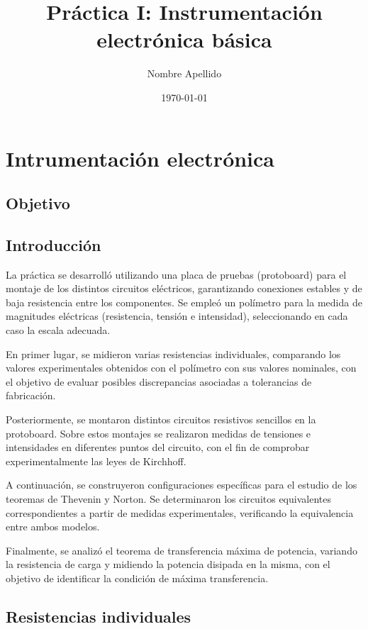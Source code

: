 \documentclass[a4paper,12pt]{article}
\title{Práctica I: Instrumentación electrónica básica}
\author{Nombre Apellido}
\date{\today}
\begin{document}
\maketitle

\tableofcontents
\newpage


\section{Intrumentación electrónica}

\subsection{Objetivo}

\subsection{Introducción}
La práctica se desarrolló utilizando una placa de pruebas (protoboard) para el montaje de los distintos circuitos eléctricos, garantizando conexiones estables y de baja resistencia entre los componentes. Se empleó un polímetro para la medida de magnitudes eléctricas (resistencia, tensión e intensidad), seleccionando en cada caso la escala adecuada.

En primer lugar, se midieron varias resistencias individuales, comparando los valores experimentales obtenidos con el polímetro con sus valores nominales, con el objetivo de evaluar posibles discrepancias asociadas a tolerancias de fabricación.

Posteriormente, se montaron distintos circuitos resistivos sencillos en la protoboard. Sobre estos montajes se realizaron medidas de tensiones e intensidades en diferentes puntos del circuito, con el fin de comprobar experimentalmente las leyes de Kirchhoff.

A continuación, se construyeron configuraciones específicas para el estudio de los teoremas de Thevenin y Norton. Se determinaron los circuitos equivalentes correspondientes a partir de medidas experimentales, verificando la equivalencia entre ambos modelos.

Finalmente, se analizó el teorema de transferencia máxima de potencia, variando la resistencia de carga y midiendo la potencia disipada en la misma, con el objetivo de identificar la condición de máxima transferencia.

\subsection{Resistencias individuales}
\end{document}
